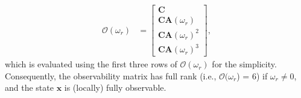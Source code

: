 \documentclass[conference]{IEEEtran}
\begin{document}
    \begin{align}\label{eqn:osv}
    {\boldsymbol{\mathcal{O}}(\omega_{r})} &= \begin{bmatrix} 
    {\boldsymbol{C}}\\\boldsymbol{C}{{\boldsymbol{A}}({\omega}_{r})}\\\boldsymbol{C}{{\boldsymbol{A}}({\omega}_{r})}^2 \\\boldsymbol{C}{{\boldsymbol{A}}({\omega}_{r})}^3  
    \end{bmatrix},
    \end{align}
which is evaluated using the first three rows of ${\boldsymbol{\mathcal{O}}(\omega_{r})}$ for the simplicity. Consequently, the observability matrix has full rank (i.e., ${\boldsymbol{\mathcal{O}}(\omega_{r}}$) = 6) if ${\omega}_{r} \neq 0$, and the state $\boldsymbol{x}$ is (locally) fully observable.

\end{document}
